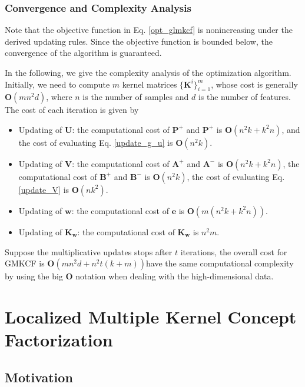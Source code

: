 \documentclass[10pt,journal,compsoc]{IEEEtran}
\begin{document}
\subsubsection{Convergence and Complexity Analysis}
Note that the objective function in Eq. \eqref{opt_glmkcf} is nonincreasing under the derived updating rules. Since the objective function is bounded below, the convergence of the algorithm is guaranteed.

In the following, we give the complexity analysis of the optimization algorithm. Initially, we need to compute $m$ kernel matrices $\{ \mathbf{K}^{i}\}_{i=1}^{m}$, whose cost is generally $\mathbf{O}(m n^2 d)$, where $n$ is the number of samples and $d$ is the number of features. The cost of each iteration is given by
\begin{itemize}
\item Updating of $\mathbf{U}$: the computational cost of $\mathbf{P}^{+}$ and $\mathbf{P}^{+}$ is $\mathbf{O}(n^2 k + k^2 n)$, and the cost of evaluating Eq. \eqref{update_g_u} is $\mathbf{O}(n^2 k)$.
\item Updating of $\mathbf{V}$: the computational cost of $\mathbf{A}^{+}$ and $\mathbf{A}^{-}$ is $\mathbf{O}(n^2 k + k^2 n)$, the computational cost of $\mathbf{B}^{+}$ and $\mathbf{B}^{-}$ is $\mathbf{O}(n^2 k)$, the cost of evaluating Eq. \eqref{update_V} is $\mathbf{O}(n k^2)$.
\item Updating of $\mathbf{w}$: the computational cost of $\mathbf{e}$ is $\mathbf{O}(m(n^2k + k^2n ))$.
\item Updating of $\mathbf{K}_{\mathbf{w}}$: the computational cost of $\mathbf{K}_{\mathbf{w}}$ is $n^2 m $.
\end{itemize}
Suppose the multiplicative updates stops after $t$ iterations, the overall cost for GMKCF is $\mathbf{O}(mn^2d + n^2t(k +  m))$have the same computational complexity by using the big $\mathbf{O}$ notation when dealing with the high-dimensional data.

\section{Localized Multiple Kernel Concept Factorization}


\subsection{Motivation}
\end{document}
